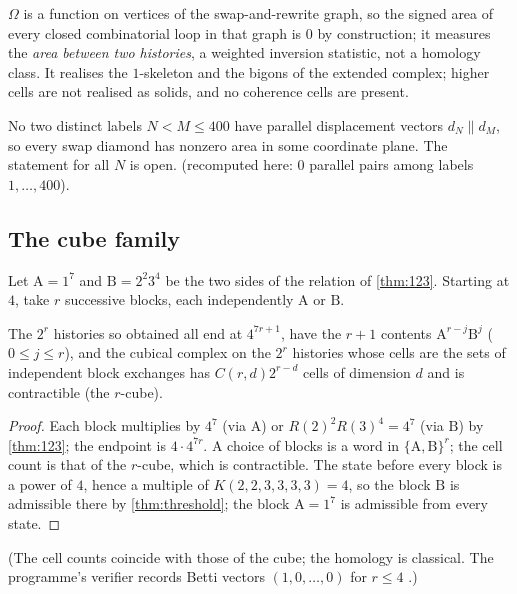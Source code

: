 \begin{remark}
$\Omega$ is a function on vertices of the swap-and-rewrite graph, so the signed area of every closed combinatorial loop in that graph is $0$ by construction; it measures the \emph{area between two histories}, a weighted inversion statistic, not a homology class. It realises the $1$-skeleton and the bigons of the extended complex; higher cells are not realised as solids, and no coherence cells are present.
\end{remark}
\begin{proposition}\label{prop:nondeg}
No two distinct labels $N<M\le400$ have parallel displacement vectors $d_N\parallel d_M$, so every swap diamond has nonzero area in some coordinate plane. The statement for all $N$ is open.  (recomputed here: $0$ parallel pairs among labels $1,\dots,400$).
\end{proposition}

\subsection{The cube family}
Let $\mathrm{A}=1^7$ and $\mathrm B=2^2 3^4$ be the two sides of the relation of \cref{thm:123}. Starting at $4$, take $r$ successive blocks, each independently $\mathrm A$ or $\mathrm B$.
\begin{theorem}\label{thm:cubefam}
The $2^r$ histories so obtained all end at $4^{7r+1}$, have the $r+1$ contents $\mathrm A^{r-j}\mathrm B^j$ ($0\le j\le r$), and the cubical complex on the $2^r$ histories whose cells are the sets of independent block exchanges has $C(r,d)2^{r-d}$ cells of dimension $d$ and is contractible (the $r$-cube).
\end{theorem}
\begin{proof}
Each block multiplies by $4^7$ (via $\mathrm A$) or $R(2)^2R(3)^4=4^7$ (via $\mathrm B$) by \cref{thm:123}; the endpoint is $4\cdot4^{7r}$. A choice of blocks is a word in $\{\mathrm A,\mathrm B\}^r$; the cell count is that of the $r$-cube, which is contractible. The state before every block is a power of $4$, hence a multiple of $K(2,2,3,3,3,3)=4$, so the block $\mathrm B$ is admissible there by \cref{thm:threshold}; the block $\mathrm A=1^7$ is admissible from every state.
\end{proof}
(The cell counts coincide with those of the cube; the homology is classical. The programme's verifier records Betti vectors $(1,0,\dots,0)$ for $r\le4$ .)

